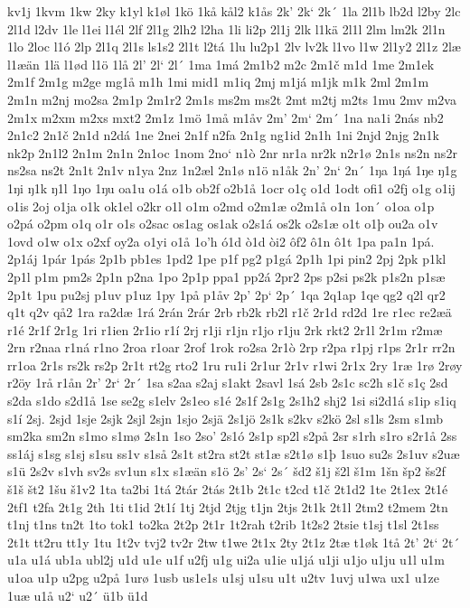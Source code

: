 kv1j
1kvm
1kw
2ky
k1yl
k1øl
1kö
1kå
kål2
k1ås
2k'
2k`
2k´
1la
2l1b
lb2d
l2by
2lc
2l1d
l2dv
1le
l1ei
l1él
2lf
2l1g
2lh2
l2ha
1li
li2p
2l1j
2lk
l1kä
2l1l
2lm
lm2k
2l1n
1lo
2loc
l1ó
2lp
2l1q
2l1s
ls1s2
2l1t
l2tá
1lu
lu2p1
2lv
lv2k
l1vo
l1w
2l1y2
2l1z
2læ
l1æän
1lä
l1ød
l1ö
1lå
2l'
2l`
2l´
1ma
1má
2m1b2
m2c
2m1č
m1d
1me
2m1ek
2m1f
2m1g
m2ge
mg1å
m1h
1mi
mid1
m1iq
2mj
m1já
m1jk
m1k
2ml
2m1m
2m1n
m2nj
mo2sa
2m1p
2m1r2
2m1s
ms2m
ms2t
2mt
m2tj
m2ts
1mu
2mv
m2va
2m1x
m2xm
m2xs
mxt2
2m1z
1mö
1må
m1åv
2m'
2m`
2m´
1na
na1i
2nás
nb2
2n1c2
2n1č
2n1d
n2dá
1ne
2nei
2n1f
n2fa
2n1g
ng1id
2n1h
1ni
2njd
2njg
2n1k
nk2p
2n1l2
2n1m
2n1n
2n1oc
1nom
2no`
n1ò
2nr
nr1a
nr2k
n2r1ø
2n1s
ns2n
ns2r
ns2sa
ns2t
2n1t
2n1v
n1ya
2nz
1n2æl
2n1ø
n1ö
n1åk
2n'
2n`
2n´
1ŋa
1ŋá
1ŋe
ŋ1g
1ŋi
ŋ1k
ŋ1l
1ŋo
1ŋu
oa1u
o1á
o1b
ob2f
o2b1å
1ocr
o1ç
o1d
1odt
ofi1
o2fj
o1g
o1ij
o1is
2oj
o1ja
o1k
ok1el
o2kr
o1l
o1m
o2md
o2m1æ
o2m1å
o1n
1on´
o1oa
o1p
o2pá
o2pm
o1q
o1r
o1s
o2sac
os1ag
os1ak
o2s1á
os2k
o2s1æ
o1t
o1þ
ou2a
o1v
1ovd
o1w
o1x
o2xf
oy2a
o1yi
o1å
1o'h
ó1d
ò1d
òi2
ôf2
ô1n
ô1t
1pa
pa1n
1pá.
2p1áj
1pár
1pás
2p1b
pb1es
1pd2
1pe
p1f
pg2
p1gá
2p1h
1pi
pin2
2pj
2pk
p1kl
2p1l
p1m
pm2s
2p1n
p2na
1po
2p1p
ppa1
pp2á
2pr2
2ps
p2si
ps2k
p1s2n
p1sæ
2p1t
1pu
pu2sj
p1uv
p1uz
1py
1på
p1åv
2p'
2p`
2p´
1qa
2q1ap
1qe
qg2
q2l
qr2
q1t
q2v
qå2
1ra
ra2dæ
1rá
2rán
2rár
2rb
rb2k
rb2l
r1č
2r1d
rd2d
1re
r1ec
re2æä
r1é
2r1f
2r1g
1ri
r1ien
2r1io
r1í
2rj
r1ji
r1jn
r1jo
r1ju
2rk
rkt2
2r1l
2r1m
r2mæ
2rn
r2naa
r1ná
r1no
2roa
r1oar
2rof
1rok
ro2sa
2r1ò
2rp
r2pa
r1pj
r1ps
2r1r
rr2n
rr1oa
2r1s
rs2k
rs2p
2r1t
rt2g
rto2
1ru
ru1i
2r1ur
2r1v
r1wi
2r1x
2ry
1ræ
1rø
2røy
r2öy
1rå
r1ån
2r'
2r`
2r´
1sa
s2aa
s2aj
s1akt
2savl
1sá
2sb
2s1c
sc2h
s1č
s1ç
2sd
s2da
s1do
s2d1å
1se
se2g
s1elv
2s1eo
s1é
2s1f
2s1g
2s1h2
shj2
1si
si2d1á
s1ip
s1iq
s1í
2sj.
2sjd
1sje
2sjk
2sjl
2sjn
1sjo
2sjä
2s1jö
2s1k
s2kv
s2kö
2sl
s1ls
2sm
s1mb
sm2ka
sm2n
s1mo
s1mø
2s1n
1so
2so'
2s1ó
2s1p
sp2l
s2på
2sr
s1rh
s1ro
s2r1å
2ss
ss1áj
s1sg
s1sj
s1su
ss1v
s1så
2s1t
st2ra
st2t
st1æ
s2t1ø
s1þ
1suo
su2s
2s1uv
s2uæ
s1ü
2s2v
s1vh
sv2s
sv1un
s1x
s1æän
s1ö
2s'
2s`
2s´
šd2
š1j
š2l
š1m
1šn
šp2
šs2f
š1š
št2
1šu
š1v2
1ta
ta2bi
1tá
2tár
2tás
2t1b
2t1c
t2cd
t1č
2t1d2
1te
2t1ex
2t1é
2tf1
t2fa
2t1g
2th
1ti
t1id
2t1í
1tj
2tjd
2tjg
t1jn
2tjs
2t1k
2t1l
2tm2
t2mem
2tn
t1nj
t1ns
tn2t
1to
tok1
to2ka
2t2p
2t1r
1t2rah
t2rib
1t2s2
2tsie
t1sj
t1sl
2t1ss
2t1t
tt2ru
tt1y
1tu
1t2v
tvj2
tv2r
2tw
t1we
2t1x
2ty
2t1z
2tæ
t1øk
1tå
2t'
2t`
2t´
u1a
u1á
ub1a
ubl2j
u1d
u1e
u1f
u2fj
u1g
ui2a
u1ie
u1já
u1ji
u1jo
u1ju
u1l
u1m
u1oa
u1p
u2pg
u2på
1urø
1usb
us1e1s
u1sj
u1su
u1t
u2tv
1uvj
u1wa
ux1
u1ze
1uæ
u1å
u2`
u2´
ü1b
ü1d
